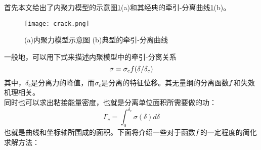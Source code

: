 \indent 首先本文给出了内聚力模型的示意图\ref{fig:crack}(a)和其经典的牵引-分离曲线\ref{fig:crack}(b)。
\begin{figure}
\centering   
\texttt{[image: crack.png]}
\caption{(a)内聚力模型示意图 (b)典型的牵引-分离曲线} 
\label{fig:crack}
\end{figure}
一般地，可以用下式来描述内聚模型中的牵引-分离关系
\begin{equation}
\sigma = \sigma_c \mathnormal{f}(\delta / \delta_c)
\end{equation}
其中，$\delta_c$是分离力的峰值，而$\sigma_c$是分离的特征位移。其无量纲的分离函数$\mathnormal{f}$和失效机理相关。\\
同时也可以求出粘接能量密度，也就是分离单位面积所需要做的功：
\begin{equation}
\Gamma_c = \int^{\delta_c}_0 \sigma(\delta) d\delta
\end{equation}
也就是曲线和坐标轴所围成的面积。下面将介绍一些对于函数$\mathnormal{f}$的一定程度的简化求解方法\cite{Elices2002The}：
